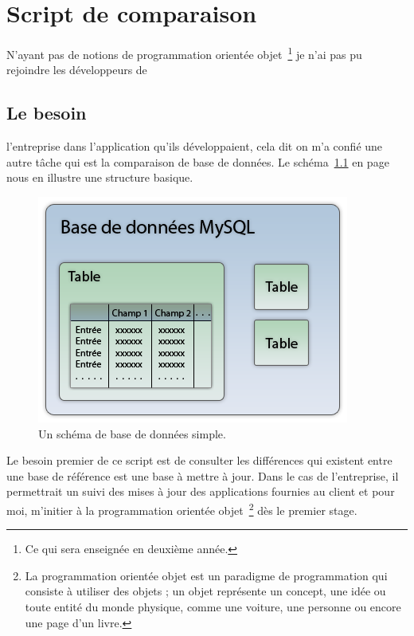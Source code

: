 \chapter{Script de comparaison} %
\label{cha:Script de comparaison}

N'ayant pas de notions de programmation orientée objet\, \footnote{Ce qui sera
enseignée en deuxième année.} je n'ai pas pu rejoindre les développeurs de
\section{Le besoin} %
\label{sec:Le besoin}

l'entreprise dans l'application qu'ils développaient, cela dit on m'a confié
une autre tâche qui est la comparaison de base de données. Le schéma~\ref{bdd}
en page~\pageref{bdd} nous en illustre une structure basique.

\begin{figure}
\begin{center}
\includegraphics[scale=0.7]{images/bdd.png}
\end{center}
\caption{Un schéma de base de données simple.}
\label{bdd}
\end{figure}

Le besoin premier de ce script est de consulter les différences qui existent
entre une base de référence est une base à mettre à jour. Dans le cas de
l'entreprise, il permettrait un suivi des mises à jour des applications
fournies au client et pour moi, m'initier à la programmation orientée objet\,
\footnote{La programmation orientée objet est un paradigme de programmation qui
consiste à utiliser des objets ; un objet représente un concept, une idée ou
toute entité du monde physique, comme une voiture, une personne ou encore une
page d'un livre.} dès le premier stage.
